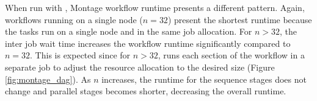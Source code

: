 %


When run with \systemname, Montage workflow runtime presents
a different pattern. Again, workflows running on a single node ($n=32$)
present the shortest runtime because the tasks run on a single node
and in the same job allocation. For $n>32$, the inter
job wait time increases the workflow runtime significantly compared to $n=32$.
This is expected since for $n>32$, \systemname runs each section of the workflow
in a separate job to adjust the resource allocation to the desired size  (Figure \ref{fig:montage_dag}). 
As $n$ increases, the runtime for the sequence stages does not
change and parallel stages becomes shorter, decreasing the overall runtime.

